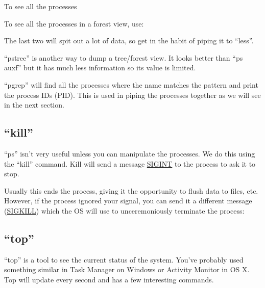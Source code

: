 \begin{prompt}
\end{prompt}

To see all the processes

\begin{prompt}
\end{prompt}

To see all the processes in a forest view, use:

\begin{prompt}
\end{prompt}

The last two will spit out a lot of data, so get in the habit of piping it to
``less''.

``pstree'' is another way to dump a tree/forest view. It looks better than ``ps
auxf'' but it has much less information so its value is limited.

``pgrep'' will find all the processes where the name matches the pattern and
print the process IDs (PID). This is used in piping the processes together as we
will see in the next section.

\subsection{``kill''}
``ps'' isn't very useful unless you can manipulate the processes. We do this
using the ``kill'' command. Kill will send a message
\href{https://en.wikipedia.org/wiki/Unix_signal#POSIX_signals}{SIGINT} to the
process to ask it to stop.

\begin{prompt}
\end{prompt}

Usually this ends the process, giving it the opportunity to flush data to files,
etc. However, if the process ignored your signal, you can send it a different
message (\href{https://www.youtube.com/watch?v=Fow7iUaKrq4}{SIGKILL}) which the OS
will use to unceremoniously terminate the process:

\begin{prompt}
\end{prompt}

\subsection{``top''}
``top'' is a tool to see the current status of the system. You've probably used
something similar in Task Manager on Windows or Activity Monitor in OS X. Top
will update every second and has a few interesting commands.

